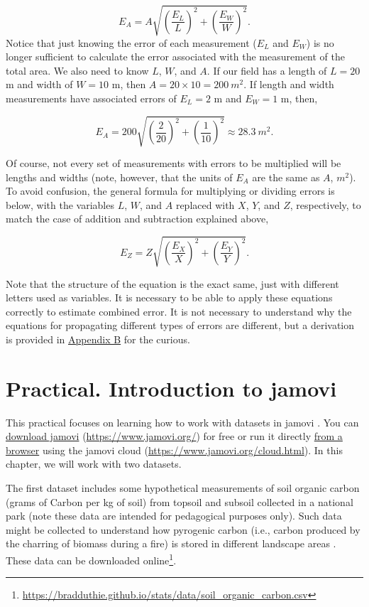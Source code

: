 \documentclass[
]{scrbook}
\begin{document}
\[E_{A} = A \sqrt{\left(\frac{E_{L}}{L} \right)^{2} + \left(\frac{E_{W}}{W} \right)^{2}}.\]
Notice that just knowing the error of each measurement (\(E_{L}\) and \(E_{W}\)) is no longer sufficient to calculate the error associated with the measurement of the total area.
We also need to know \(L\), \(W\), and \(A\).
If our field has a length of \(L = 20\) m and width of \(W = 10\) m, then \(A = 20 \times 10 = 200\:m^{2}\).
If length and width measurements have associated errors of \(E_{L} = 2\) m and \(E_{W} = 1\) m, then,

\[E_{A} = 200 \sqrt{\left(\frac{2}{20} \right)^{2} + \left(\frac{1}{10} \right)^{2}} \approx 28.3\:m^{2}.\]

Of course, not every set of measurements with errors to be multiplied will be lengths and widths (note, however, that the units of \(E_{A}\) are the same as \(A\), \(m^{2}\)).
To avoid confusion, the general formula for multiplying or dividing errors is below, with the variables \(L\), \(W\), and \(A\) replaced with \(X\), \(Y\), and \(Z\), respectively, to match the case of addition and subtraction explained above,

\[E_{Z} = Z \sqrt{\left(\frac{E_{X}}{X} \right)^{2} + \left(\frac{E_{Y}}{Y} \right)^{2}}.\]

Note that the structure of the equation is the exact same, just with different letters used as variables.
It is necessary to be able to apply these equations correctly to estimate combined error.
It is not necessary to understand why the equations for propagating different types of errors are different, but a derivation is provided in \protect\hyperlink{uncertainty_derivation}{Appendix B} for the curious.

\hypertarget{Chapter_8}{%
\chapter{Practical. Introduction to jamovi}\label{Chapter_8}}

This practical focuses on learning how to work with datasets in jamovi \citep{Jamovi2022}.
You can \href{https://www.jamovi.org/download.html}{download jamovi} (\url{https://www.jamovi.org/}) for free or run it directly \href{https://www.jamovi.org/cloud.html}{from a browser} using the jamovi cloud (\url{https://www.jamovi.org/cloud.html}).
In this chapter, we will work with two datasets.

The first dataset includes some hypothetical measurements of soil organic carbon (grams of Carbon per kg of soil) from topsoil and subsoil collected in a national park (note these data are intended for pedagogical purposes only).
Such data might be collected to understand how pyrogenic carbon (i.e., carbon produced by the charring of biomass during a fire) is stored in different landscape areas \citep{Santin2016, Preston2006}.
These data can be downloaded online\footnote{\url{https://bradduthie.github.io/stats/data/soil_organic_carbon.csv}}.
\end{document}
